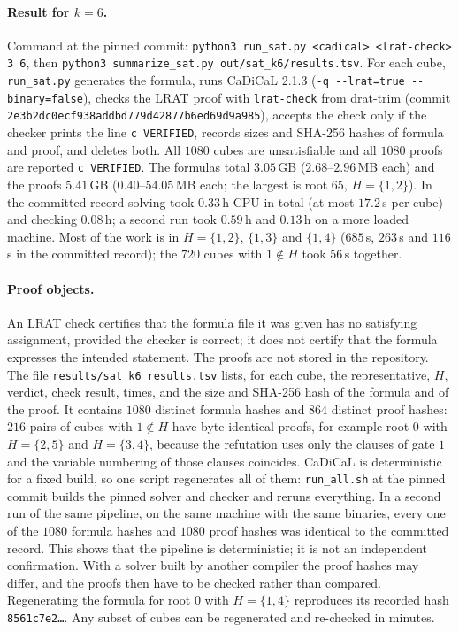\documentclass[11pt,a4paper]{article}
\theoremstyle{definition}
\newcommand{\code}[1]{\texttt{#1}}
\begin{document}
\paragraph{Result for $k=6$.} Command at the pinned commit: \code{python3 run\_sat.py <cadical> <lrat-check> 3 6}, then \code{python3 summarize\_sat.py out/sat\_k6/results.tsv}. For each cube, \code{run\_sat.py} generates the formula, runs CaDiCaL 2.1.3 \cite{CaDiCaL2} (\code{-q -{}-lrat=true -{}-binary=false}), checks the LRAT proof \cite{CruzFilipe17} with \code{lrat-check} from drat-trim \cite{Wetzler14} (commit \code{2e3b2dc0ecf938add}\allowbreak\code{bd779d42877b6ed69d9a985}), accepts the check only if the checker prints the line \code{c VERIFIED}, records sizes and SHA-256 hashes of formula and proof, and deletes both. All $1080$ cubes are unsatisfiable and all $1080$ proofs are reported \code{c VERIFIED}. The formulas total $3.05$\,GB ($2.68$--$2.96$\,MB each) and the proofs $5.41$\,GB ($0.40$--$54.05$\,MB each; the largest is root $65$, $H=\{1,2\}$). In the committed record solving took $0.33$\,h CPU in total (at most $17.2$\,s per cube) and checking $0.08$\,h; a second run took $0.59$\,h and $0.13$\,h on a more loaded machine. Most of the work is in $H=\{1,2\}$, $\{1,3\}$ and $\{1,4\}$ ($685$\,s, $263$\,s and $116$\,s in the committed record); the $720$ cubes with $1\notin H$ took $56$\,s together.

\paragraph{Proof objects.} An LRAT check certifies that the formula file it was given has no satisfying assignment, provided the checker is correct; it does not certify that the formula expresses the intended statement. The proofs are not stored in the repository. The file \code{results/sat\_k6\_results.tsv} lists, for each cube, the representative, $H$, verdict, check result, times, and the size and SHA-256 hash of the formula and of the proof. It contains $1080$ distinct formula hashes and $864$ distinct proof hashes: $216$ pairs of cubes with $1\notin H$ have byte-identical proofs, for example root $0$ with $H=\{2,5\}$ and $H=\{3,4\}$, because the refutation uses only the clauses of gate $1$ and the variable numbering of those clauses coincides. CaDiCaL is deterministic for a fixed build, so one script regenerates all of them: \code{run\_all.sh} at the pinned commit builds the pinned solver and checker and reruns everything. In a second run of the same pipeline, on the same machine with the same binaries, every one of the $1080$ formula hashes and $1080$ proof hashes was identical to the committed record. This shows that the pipeline is deterministic; it is not an independent confirmation. With a solver built by another compiler the proof hashes may differ, and the proofs then have to be checked rather than compared. Regenerating the formula for root $0$ with $H=\{1,4\}$ reproduces its recorded hash \code{8561c7e2\ldots}. Any subset of cubes can be regenerated and re-checked in minutes.
\end{document}
